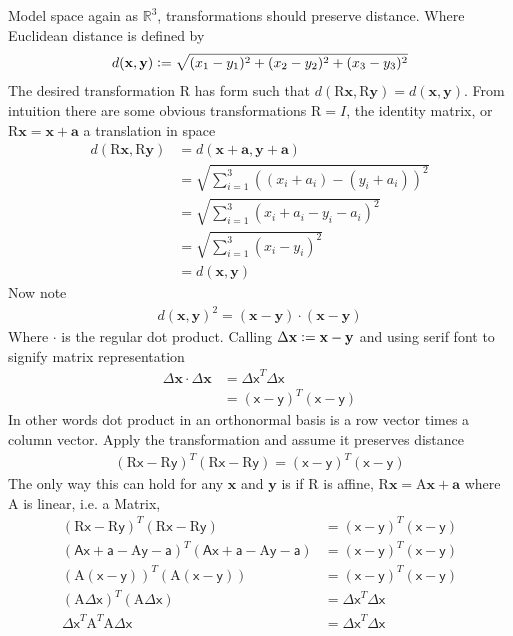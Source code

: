 \documentclass[floatfix,aps,prd,amsmath,amssymb]{revtex4}
\begin{document}
Model space again as $\mathbb{R}^3$, transformations should preserve distance. Where Euclidean distance is defined by
\begin{align*}
d(\mathbf{x},\mathbf{y})\vcentcolon = \sqrt{(x_1-y_1)^2+(x_2-y_2)^2+(x_3-y_3)^2}
\end{align*}
 The desired transformation $\mathrm{R}$ has form such that $d(\mathrm{R}\mathbf{x},\mathrm{R}\mathbf{y}) = d(\mathbf{x},\mathbf{y})$. From intuition there are some obvious transformations $\mathrm{R}=I$, the identity matrix, or $\mathrm{R}\mathbf{x} = \mathbf{x}+\mathbf{a}$ a translation in space
\begin{align*}
d(\mathrm{R}\mathbf{x},\mathrm{R}\mathbf{y}) &= d(\mathbf{x}+\mathbf{a},\mathbf{y}+\mathbf{a}) \\
&= \sqrt{\sum_{i=1}^3((x_i+a_i)-(y_i+a_i))^2} \\
&= \sqrt{\sum_{i=1}^3(x_i+a_i-y_i-a_i)^2} \\
&= \sqrt{\sum_{i=1}^3(x_i-y_i)^2} \\
&= d(\mathbf{x},\mathbf{y})
\end{align*}
Now note
\begin{align*}
d(\mathbf{x},\mathbf{y})^2=(\mathbf{x}-\mathbf{y})\cdot(\mathbf{x}-\mathbf{y})
\end{align*}
Where $\cdot$ is the regular dot product. Calling $\Delta\mathbf{x}\vcentcolon =\mathbf{x}-\mathbf{y}$ and using serif font to signify matrix representation
\begin{align*}
\Delta\mathbf{x}\cdot\Delta\mathbf{x} &= \mathsf{\Delta x}^T \mathsf{\Delta x} \\
&= (\mathsf{x}-\mathsf{y})^T(\mathsf{x}-\mathsf{y})
\end{align*}
In other words dot product in an orthonormal basis is a row vector times a column vector. Apply the transformation and assume it preserves distance
\begin{align*}
(\mathrm{R}\mathsf{x}-\mathrm{R}\mathsf{y})^T(\mathrm{R}\mathsf{x}-\mathrm{R}\mathsf{y}) = (\mathsf{x}-\mathsf{y})^T(\mathsf{x}-\mathsf{y})
\end{align*}
The only way this can hold for any $\mathbf{x}$ and $\mathbf{y}$ is if $\mathrm{R}$ is affine, $\mathrm{R}\mathbf{x}=\mathrm{A}\mathbf{x}+\mathbf{a}$ where $\mathrm{A}$ is linear, i.e. a Matrix,
\begin{align*}
(\mathrm{R}\mathsf{x}-\mathrm{R}\mathsf{y})^T(\mathrm{R}\mathsf{x}-\mathrm{R}\mathsf{y}) &= (\mathsf{x}-\mathsf{y})^T(\mathsf{x}-\mathsf{y}) \\
(\mathsf{A}\mathsf{x}+\mathsf{a}-\mathrm{A}\mathsf{y}-\mathsf{a})^T(\mathsf{A}\mathsf{x}+\mathsf{a}-\mathrm{A}\mathsf{y}-\mathsf{a}) &= (\mathsf{x}-\mathsf{y})^T(\mathsf{x}-\mathsf{y})\\
(\mathrm{A}(\mathsf{x}-\mathsf{y}))^T(\mathrm{A}(\mathsf{x}-\mathsf{y})) &= (\mathsf{x}-\mathsf{y})^T(\mathsf{x}-\mathsf{y}) \\
(\mathrm{A}\mathsf{\Delta x})^T(\mathrm{A}\mathsf{\Delta x}) &= \mathsf{\Delta x}^T\mathsf{\Delta x} \\
\mathsf{\Delta x}^T\mathrm{A}^T\mathrm{A}\mathsf{\Delta x} &= \mathsf{\Delta x}^T\mathsf{\Delta x}
\end{align*}
\end{document}
